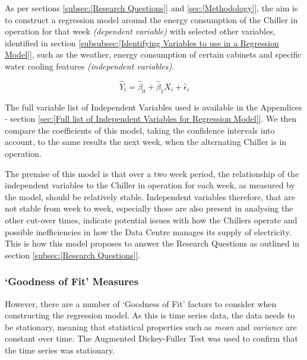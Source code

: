 \documentclass[12pt]{scrartcl}
\begin{document}
As per sections \ref{subsec:[Research Questions]} and \ref{sec:[Methodology]}, the aim is to construct a regression model around the energy consumption of the Chiller in operation for that week \textit{(dependent variable)} with selected other variables, identified in section \ref{subsubsec:[Identifying Variables to use in a Regression Model]}, such as the weather, energy consumption of certain cabinets and specific water cooling features \textit{(independent variables)}. 

\begin{equation}
\hat{Y}_i = \hat{\beta}_0 + \hat{\beta}_1 X_i + \hat{\epsilon}_i
\end{equation}

The full variable list of Independent Variables used is available in the Appendices - section \ref{sec:[Full list of Independent Variables for Regression Model]}. We then compare the coefficients of this model, taking the confidence intervals into account, to the same results the next week, when the alternating Chiller is in operation. 

The premise of this model is that over a two week period, the relationship of the independent variables to the Chiller in operation for each week, as measured by the model, should be relatively stable. Independent variables therefore, that are not stable from week to week, especially those are also present in analysing the other cut-over times, indicate potential issues with how the Chillers operate and possible inefficiencies in how the Data Centre manages its supply of electricity. This is how this model proposes to answer the Research Questions as outlined in section \ref{subsec:[Research Questions]}.  


\subsubsection{`Goodness of Fit' Measures}
\label{subsubsec:['Goodness of Fit' Measures]}
However, there are a number of `Goodness of Fit' factors to consider when constructing the regression model. As this is time series data, the data needs to be stationary, meaning that statistical properties such as \textit{mean} and \textit{variance} are constant over time. The Augmented Dickey-Fuller Test was used to confirm that the time series was stationary.
\end{document}
